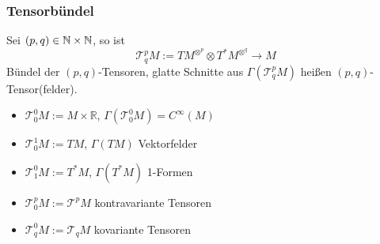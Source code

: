 \subsubsection{Tensorbündel}
\label{ssub:175}
Sei $(p,q)\in \mathbb{N}\times \mathbb{N}$, so ist
\[
\mathcal{T}^p_q M := TM^{\otimes^p}\otimes T^* M^{\otimes^q}\to M
\]
Bündel der $(p,q)$-Tensoren, glatte Schnitte aus $\Gamma(\mathcal{T}^p_q M)$ heißen $(p,q)$- Tensor(felder).
\begin{itemize}
\item $\mathcal{T}_0^0 M := M\times \mathds{R}$, $\Gamma(\mathcal{T}_0^0 M) = C^\infty (M)$
\item $\mathcal{T}_0^1 M := TM$, $\Gamma(TM)$ Vektorfelder
\item $\mathcal{T}_1^0 M := T^*M$, $\Gamma(T^* M)$ 1-Formen
\item $\mathcal{T}_0^p M := \mathcal{T}^p M$ kontravariante Tensoren
\item $\mathcal{T}_q^0 M := \mathcal{T}_q M$ kovariante Tensoren
\end{itemize}

